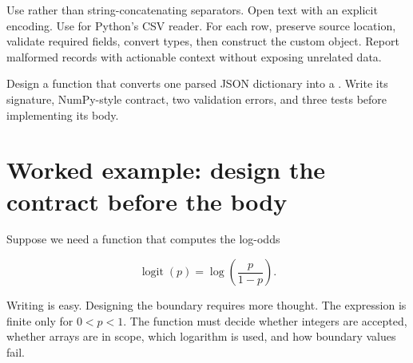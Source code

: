 Use  rather than string-concatenating separators. Open text
with an explicit encoding. Use  for Python's CSV reader. For
each row, preserve source location, validate required fields, convert types,
then construct the custom object. Report malformed records with actionable
context without exposing unrelated data.

\begin{checkpointbox}
Design a function that converts one parsed JSON dictionary into a
. Write its signature, NumPy-style contract, two validation
errors, and three tests before implementing its body.
\end{checkpointbox}

\section{Worked example: design the contract before the body}

Suppose we need a function that computes the log-odds

\[
  \operatorname{logit}(p) = \log\!\left(\frac{p}{1-p}\right).
\]

Writing  is easy. Designing the boundary requires more
thought. The expression is finite only for $0 < p < 1$. The function must decide
whether integers are accepted, whether arrays are in scope, which logarithm is
used, and how boundary values fail.

